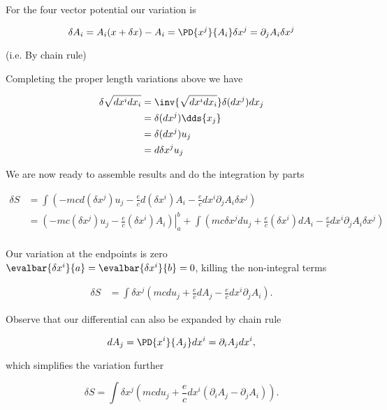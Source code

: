 For the four vector potential our variation is

\begin{equation}\label{eqn:relativisticElectrodynamicsL10:n}
\delta A_i = A_i(x + \delta x) - A_i = \PD{x^j}{A_i} \delta x^j = \partial_j A_i \delta x^j
\end{equation}

(i.e. By chain rule)

Completing the proper length variations above we have

\begin{align*}
\delta \sqrt{ dx^i dx_i } 
&= \inv{ \sqrt{ dx^i dx_i }} \delta (dx^j) dx_j \\
&= \delta (dx^j) \dds{x_j}  \\
&= \delta (dx^j) u_j \\
&= d \delta x^j u_j
\end{align*}

We are now ready to assemble results and do the integration by parts

\begin{align*}
\delta S 
&= \int \left( 
-m c d (\delta x^j) u_j
- \frac{e}{c} d (\delta x^i) A_i 
- \frac{e}{c} dx^i \partial_j A_i \delta x^j
\right) \\
&= 
{\left. 
\left( -m c (\delta x^j) u_j - \frac{e}{c} (\delta x^i) A_i \right)
\right\vert}_a^b
+\int \left( 
m c \delta x^j d u_j
+ \frac{e}{c} (\delta x^i) d A_i 
- \frac{e}{c} dx^i \partial_j A_i \delta x^j
\right) \\
\end{align*}

Our variation at the endpoints is zero $\evalbar{\delta x^i}{a} = \evalbar{\delta x^i}{b} = 0$, killing the non-integral terms

\begin{align*}
\delta S 
&= 
\int 
\delta x^j
\left( 
m c d u_j
+ \frac{e}{c} d A_j 
- \frac{e}{c} dx^i \partial_j A_i 
\right).
\end{align*}

Observe that our differential can also be expanded by chain rule

\begin{equation}\label{eqn:relativisticElectrodynamicsL10:n}
d A_j = \PD{x^i}{A_j} dx^i = \partial_i A_j dx^i,
\end{equation}

which simplifies the variation further

\begin{equation}\label{eqn:relativisticElectrodynamicsL10:n}
\delta S 
= 
\int 
\delta x^j
\left( 
m c d u_j
+ \frac{e}{c} dx^i ( \partial_i A_j - \partial_j A_i )
\right).
\end{equation}


